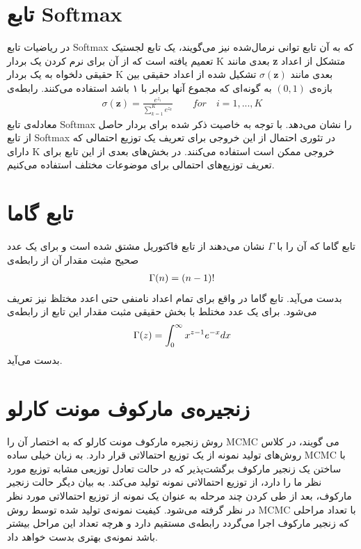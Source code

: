 \section{تابع Softmax}
\label{chap2sec9}
در ریاضیات تابع
Softmax
که به آن تابع توانی‌ نرمال‌شده
 نیز می‌‌گویند، یک تابع لجستیک تعمیم یافته است که از آن برای نرم کردن یک بردار
K
بعدی مانند
\textbf{z}
متشکل از اعداد حقیقی‌ دلخواه به یک بردار
K
بعدی مانند
$\sigma(\textbf{z})$ 
تشکیل شده از اعداد حقیقی‌ بین بازه‌ی
$(0,1)$
به گونه‌ای که مجموع آنها برابر با ۱ باشد استفاده می‌‌کنند. رابطه‌ی
\begin{align}
	\sigma(\textbf{z}) = \frac{e^{z_i}}{\sum_{k=1}^{K}e^{z_k}} \quad\quad for\quad i = 1, ..., K
	\label{eq2}
\end{align}
معادله‌ی تابع
Softmax
را نشان می‌‌دهد. با توجه به خاصیت ذکر شده برای بردار حاصل از تابع
Softmax
در تئوری احتمال از این خروجی برای تعریف یک توزیع احتمالی که دارای
K
خروجی ممکن است استفاده می‌کنند. در بخش‌های بعدی از این تابع برای تعریف توزیع‌های احتمالی‌ برای موضوعات مختلف استفاده می‌‌کنیم.


\section{تابع گاما}
\label{chap2sec8}
تابع گاما
 که آن را با
$\Gamma$
نشان می‌‌دهند از تابع فاکتوریل مشتق شده است و برای یک عدد صحیح مثبت مقدار آن از رابطه‌ی
\begin{align}
	\centering
	\label{eq13}
	\Gamma(n) = (n-1)!
\end{align}
بدست می‌‌آید. تابع گاما در واقع برای تمام اعداد نامنفی حتی اعدد مختلظ نیز تعریف می‌‌شود. برای یک عدد مختلط با بخش حقیقی مثبت مقدار این تابع از رابطه‌ی
\begin{align}
	\centering
	\label{eq14}
	\Gamma(z) = \int_{0}^{\infty} x^{z-1}e^{-x}dx
\end{align}
بدست می‌‌آید.

\section{زنجیره‌ی مارکوف مونت کارلو}
\label{chap2sec6}
روش زنجیره‌ مارکوف مونت کارلو
 که به اختصار آن را
MCMC
می‌ گویند، در کلاس روش‌های تولید نمونه از یک توزیع احتمالاتی قرار دارد. به زبان خیلی‌ ساده
MCMC
با ساختن یک زنجیر مارکوف برگشت‌پذیر
که در حالت تعادل توزیعی مشابه توزیع مورد نظر ما را دارد، از توزیع احتمالاتی نمونه تولید می‌‌کند. به بیان دیگر حالت زنجیر مارکوف، بعد از طی‌ کردن چند مرحله به عنوان یک نمونه از توزیع احتمالاتی مورد نظر در نظر گرفته می‌شود. کیفیت نمونه‌‌ی تولید شده توسط روش
MCMC
با تعداد مراحلی که زنجیر مارکوف اجرا می‌‌گردد رابطه‌ی مستقیم دارد و هرچه تعداد این مراحل بیشتر باشد نمونه‌ی بهتری بدست خواهد داد.


